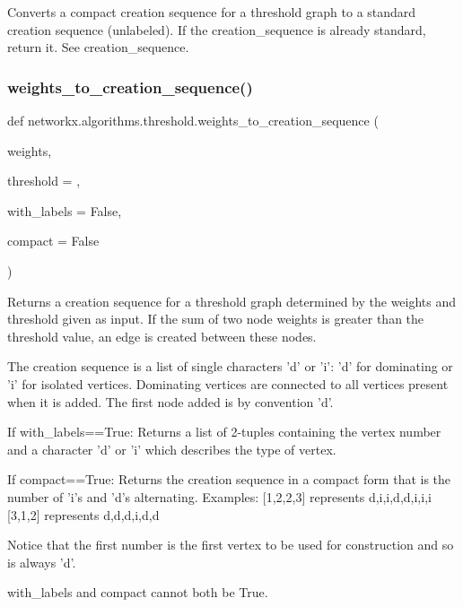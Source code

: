 \begin{DoxyVerb}Converts a compact creation sequence for a threshold
graph to a standard creation sequence (unlabeled).
If the creation_sequence is already standard, return it.
See creation_sequence.
\end{DoxyVerb}
 \mbox{\label{namespacenetworkx_1_1algorithms_1_1threshold_af967d42f89e8b2692a23fee2e85edb07}} 
\subsubsection{\texorpdfstring{weights\+\_\+to\+\_\+creation\+\_\+sequence()}{weights\_to\_creation\_sequence()}}
{\footnotesize\ttfamily def networkx.\+algorithms.\+threshold.\+weights\+\_\+to\+\_\+creation\+\_\+sequence (\begin{DoxyParamCaption}\item[{}]{weights,  }\item[{}]{threshold = {},  }\item[{}]{with\+\_\+labels = {\ttfamily False},  }\item[{}]{compact = {\ttfamily False} }\end{DoxyParamCaption})}

\begin{DoxyVerb}Returns a creation sequence for a threshold graph
determined by the weights and threshold given as input.
If the sum of two node weights is greater than the
threshold value, an edge is created between these nodes.

The creation sequence is a list of single characters 'd'
or 'i': 'd' for dominating or 'i' for isolated vertices.
Dominating vertices are connected to all vertices present
when it is added.  The first node added is by convention 'd'.

If with_labels==True:
Returns a list of 2-tuples containing the vertex number
and a character 'd' or 'i' which describes the type of vertex.

If compact==True:
Returns the creation sequence in a compact form that is the number
of 'i's and 'd's alternating.
Examples:
[1,2,2,3] represents d,i,i,d,d,i,i,i
[3,1,2] represents d,d,d,i,d,d

Notice that the first number is the first vertex to be used for
construction and so is always 'd'.

with_labels and compact cannot both be True.
\end{DoxyVerb}
 